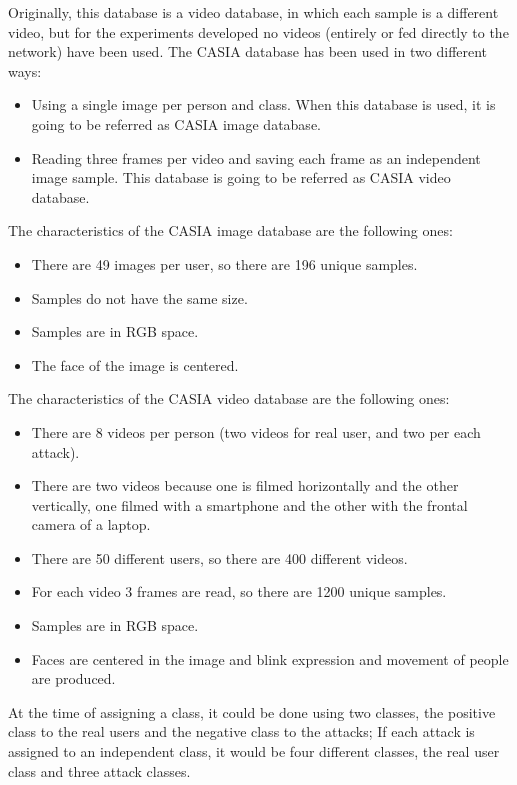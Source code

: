 Originally, this database is a video database, in which each sample is a different video, but for the experiments developed no videos (entirely or fed directly to the network) have been used. The CASIA database has been used in two different ways:
\begin{itemize} [itemsep=2pt,topsep=8pt,parsep=0pt,partopsep=20pt]
 \item Using a single image per person and class. When this database is used, it is going to be referred as CASIA image database.
 \item Reading three frames per video and saving each frame as an independent image sample. This database is going to be referred as CASIA video database.
\end{itemize}

The characteristics of the CASIA image database are the following ones:
\begin{itemize}[itemsep=2pt,topsep=8pt,parsep=0pt,partopsep=20pt]
\item There are 49 images per user, so there are 196 unique samples.
\item Samples do not have the same size.
\item Samples are in RGB space.
\item The face of the image is centered.
\end{itemize}

The characteristics of the CASIA video database are the following ones:
\begin{itemize}[itemsep=2pt,topsep=8pt,parsep=0pt,partopsep=20pt]
\item There are 8 videos per person (two videos for real user, and two per each attack).
\item There are two videos because one is filmed horizontally and the other vertically, one filmed with a smartphone and the other with the frontal camera of a laptop.
\item There are 50 different users, so there are 400 different videos.
\item For each video 3 frames are read, so there are 1200 unique samples.
\item Samples are in RGB space.
\item Faces are centered in the image and blink expression and movement of people are produced.
\end{itemize}

At the time of assigning a class, it could be done using two classes, the positive class to the real users and the negative class to the attacks; If each attack is assigned to an independent class, it would be four different classes, the real user class and three attack classes.\\

